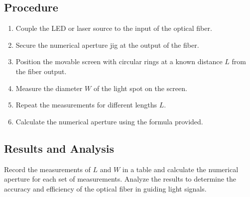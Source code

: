 \documentclass{article}
\theoremstyle{mytheoremstyle}
\theoremstyle{mytheoremstyle}
\theoremstyle{myproblemstyle}
\begin{document}
\subsection{Procedure}

\begin{enumerate}
    \item Couple the LED or laser source to the input of the optical fiber.
    \item Secure the numerical aperture jig at the output of the fiber.
    \item Position the movable screen with circular rings at a known distance \(L\) from the fiber output.
    \item Measure the diameter \(W\) of the light spot on the screen.
    \item Repeat the measurements for different lengths \(L\).
    \item Calculate the numerical aperture using the formula provided.
\end{enumerate}

\subsection{Results and Analysis}

Record the measurements of \(L\) and \(W\) in a table and calculate the numerical aperture for each set of measurements. Analyze the results to determine the accuracy and efficiency of the optical fiber in guiding light signals.
\end{document}
